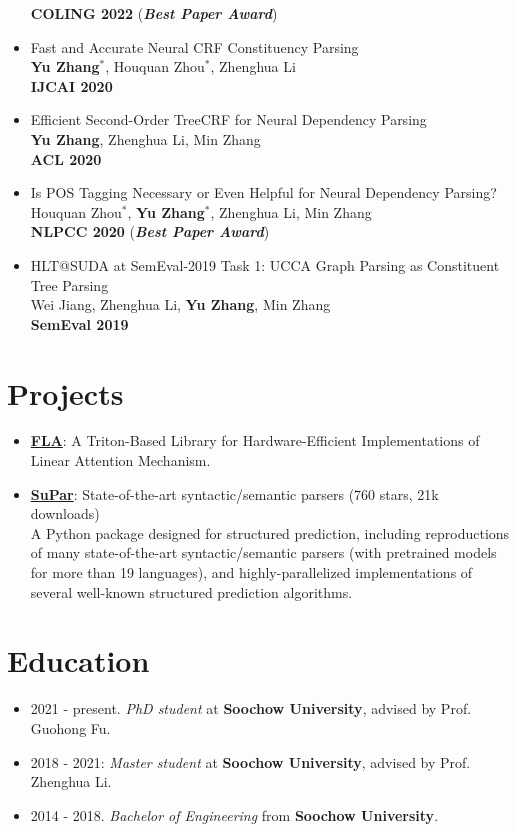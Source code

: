 \documentclass[a4paper,12pt]{article}
\begin{document}
\begin{itemize}[leftmargin=18pt]
            \textbf{COLING 2022} (\textbf{\emph{\textcolor{brickred}{Best Paper Award}}})
      \item Fast and Accurate Neural CRF Constituency Parsing\\
            \textbf{Yu Zhang$^*$}, Houquan Zhou$^*$, Zhenghua Li\\
            \textbf{IJCAI 2020}
      \item Efficient Second-Order TreeCRF for Neural Dependency Parsing\\
            \textbf{Yu Zhang}, Zhenghua Li, Min Zhang\\
            \textbf{ACL 2020}
      \item Is POS Tagging Necessary or Even Helpful for Neural Dependency Parsing?\\
            Houquan Zhou$^*$, \textbf{Yu Zhang$^*$}, Zhenghua Li, Min Zhang\\
            \textbf{NLPCC 2020} (\textbf{\emph{\textcolor{brickred}{Best Paper Award}}})
      \item HLT@SUDA at SemEval-2019 Task 1: UCCA Graph Parsing as Constituent Tree Parsing\\
            Wei Jiang, Zhenghua Li, \textbf{Yu Zhang}, Min Zhang\\
            \textbf{SemEval 2019}
\end{itemize}

\section{Projects}
\begin{itemize}[leftmargin=18pt]
      \item \href{https://github.com/sustcsonglin/flash-linear-attention}{\textbf{FLA}}: A Triton-Based Library for Hardware-Efficient Implementations of Linear Attention Mechanism.
      \item \href{https://github.com/yzhangcs/parser}{\textbf{SuPar}}: State-of-the-art syntactic/semantic parsers (760 stars, 21k downloads)\\
            A Python package designed for structured prediction, including reproductions of many state-of-the-art syntactic/semantic parsers (with pretrained models for more than 19 languages), and highly-parallelized implementations of several well-known structured prediction algorithms.
\end{itemize}

\section{Education}
\begin{itemize}[leftmargin=18pt]
      \item 2021 - present. \emph{PhD student} at \textbf{Soochow University}, advised by Prof. Guohong Fu.
      \item 2018 - 2021: \emph{Master student} at \textbf{Soochow University}, advised by Prof. Zhenghua Li.
      \item 2014 - 2018. \emph{Bachelor of Engineering} from \textbf{Soochow University}.
\end{itemize}
\end{document}
